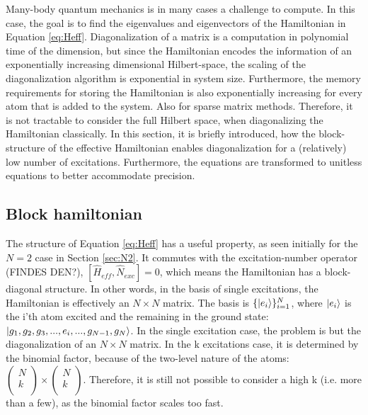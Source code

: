 \documentclass{article}
\begin{document}
Many-body quantum mechanics is in many cases a challenge to compute. In this case, the goal is to find the eigenvalues and eigenvectors of the Hamiltonian in Equation \ref{eq:Heff}. Diagonalization of a matrix is a computation in polynomial time of the dimension, but since the Hamiltonian encodes the information of an exponentially increasing dimensional Hilbert-space, the scaling of the diagonalization algorithm is exponential in system size. Furthermore, the memory requirements for storing the Hamiltonian is also exponentially increasing for every atom that is added to the system. Also for sparse matrix methods. Therefore, it is not tractable to consider the full Hilbert space, when diagonalizing the Hamiltonian classically. In this section, it is briefly introduced, how the block-structure of the effective Hamiltonian enables diagonalization for a (relatively) low number of excitations. Furthermore, the equations are transformed to unitless equations to better accommodate precision. 

\subsection{Block hamiltonian}\label{sec:block}

The structure of Equation \ref{eq:Heff} has a useful property, as seen initially for the $N=2$ case in Section \ref{sec:N2}. It commutes with the excitation-number operator (FINDES DEN?), $[\hat{H}_{eff}, \hat{N}_{exc}] = 0$, which means the Hamiltonian has a block-diagonal structure. In other words, in the basis of single excitations, the Hamiltonian is effectively an $N \times N$ matrix. The basis is $\{ \ket{e_i} \}_{i=1}^N$, where $\ket{e_i}$ is the i'th atom excited and the remaining in the ground state: $\ket{g_1, g_2, g_3, ..., e_i, ..., g_{N-1}, g_N}$. In the single excitation case, the problem is but the diagonalization of an $N \times N$ matrix. In the k excitations case, it is determined by the binomial factor, because of the two-level nature of the atoms: $\begin{pmatrix} N \\ k \\ \end{pmatrix} \times \begin{pmatrix} N \\ k \\ \end{pmatrix}$. Therefore, it is still not possible to consider a high k (i.e. more than a few), as the binomial factor scales too fast. 
\end{document}
